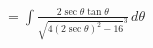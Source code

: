 \documentclass[preview]{standalone}
\begin{document}
\begin{align*}
&= \int \frac{2\sec\theta\tan\theta}{\sqrt{4(2\sec\theta)^2-16}^3} \, d\theta \\
\end{align*}
\end{document}

